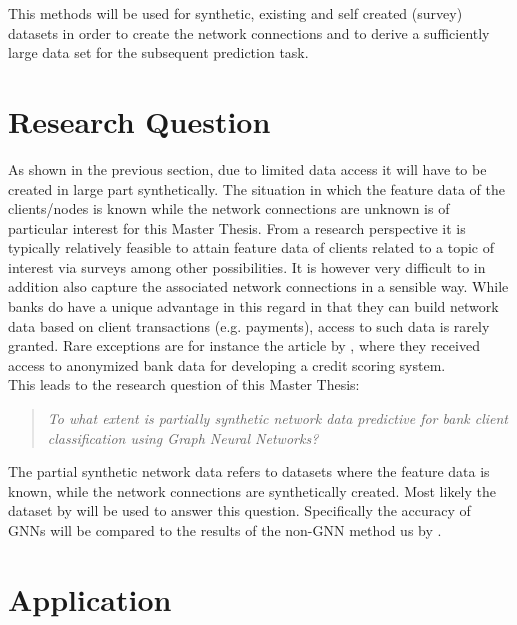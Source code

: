 \documentclass[12pt,a4paper]{article}
\begin{document}
	This methods will be used for synthetic, existing and self created (survey) datasets in order to create the network connections and to derive a 
	sufficiently large data set for the subsequent prediction task. 

	\section{Research Question}

	As shown in the previous section, due to limited data access it will have to be created in large part synthetically. The situation in which the 
	feature data of the clients/nodes is known while the network connections are unknown is of particular interest for this Master Thesis. From a 
	research perspective it is typically relatively feasible to attain feature data of clients related to a topic of interest via surveys among other 
	possibilities. It is however very difficult to in addition also capture the associated network connections in a sensible way. While banks 
	do have a unique advantage in this regard in that they can build network data based on client transactions (e.g. payments), access to such data is
	rarely granted. Rare exceptions are for instance the article by \citet{sukharev2020ews}, where they received access to anonymized bank data for
	developing a credit scoring system. \\

	\noindent This leads to the research question of this Master Thesis:

	\begin{quote}
		\textit{To what extent is partially synthetic network data predictive for bank client classification using Graph Neural Networks?} 
	\end{quote}
	
	\noindent The partial synthetic network data refers to datasets where the feature data is known, while the network connections are synthetically 
	created. Most likely the dataset by \citet{moro2014data} will be used to answer this question. Specifically the accuracy of GNNs will be compared
	to the results of the non-GNN method us by \citet{moro2014data}. \\

	\section{Application}
\end{document}

